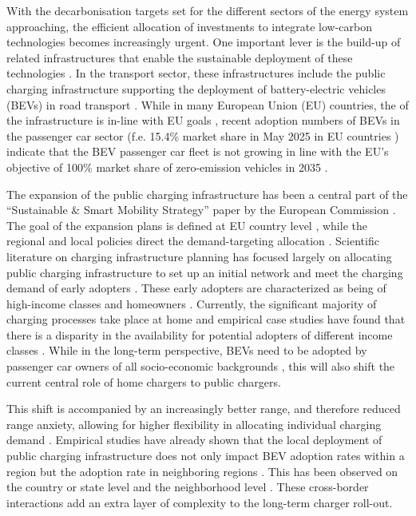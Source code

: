 \documentclass[preprint,review,11pt, authoryear]{elsarticle}
\begin{document}
    With the decarbonisation targets set for the different sectors of the energy system approaching, the efficient allocation of investments to integrate low-carbon technologies becomes increasingly urgent. One important lever is the build-up of related infrastructures that enable the sustainable deployment of these technologies \citep{KLITKOU201522}. In the transport sector, these infrastructures include the public charging infrastructure supporting the deployment of battery-electric vehicles (BEVs) in  road transport \citep{STAJIC2023100658}. While in many European Union (EU) countries, the  of the infrastructure is in-line with EU goals \citep{transport2024afir}, recent adoption numbers of BEVs in the passenger car sector (f.e. 15.4\% market share in May 2025 in EU countries \citep{acea2025may}) indicate that the BEV passenger car fleet is not growing in line with the EU's objective of 100\% market share of zero-emission vehicles in 2035 \citep{tmleuven2025zeroemission}. 

    The expansion of the public charging infrastructure has been a central part of the ``Sustainable \& Smart Mobility Strategy'' paper by the European Commission  \citep{eu2021mobility}. The goal of the expansion plans is defined at  EU country level \citep{transport2024afir}, while the regional and local policies direct the demand-targeting allocation \citep{LAMONACA2022111733}. Scientific literature on charging infrastructure planning has focused largely on allocating public charging infrastructure to set up an initial network and meet the charging demand of early adopters \citep{METAIS2022111719, https://doi.org/10.1002/wene.306}. These early adopters are characterized as being of high-income classes and homeowners \citep{BRUCKMANN2021102615}. Currently, the significant majority of charging processes take place at home \citep{BARESCH2019388} and empirical case studies have found that there is a disparity in the availability for potential adopters of different income classes \citep{GAZMEH2024104222}. While in the long-term perspective, BEVs need to be adopted by passenger car owners of all socio-economic backgrounds \citep{HOPKINS2023113398}, this will also shift the current central role of home chargers to public chargers.
    
    This shift is accompanied by an increasingly better range, and therefore reduced range anxiety, allowing for higher flexibility in allocating individual charging demand \citep{SPAVEN2022133349}. Empirical studies have already shown that the local deployment of public charging infrastructure does not only impact BEV adoption rates within a region but the adoption rate in neighboring regions \citep{QIAN2024104400}. This has been observed on the country or state level and the neighborhood level \citep{SELENASHENG2022103256}. These cross-border interactions add an extra layer of complexity to the long-term charger roll-out.
\end{document}
